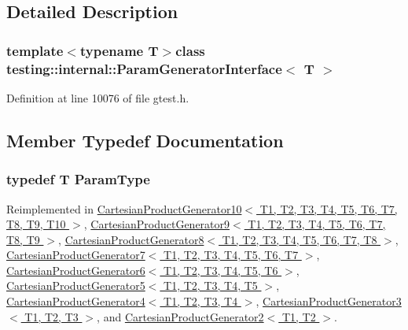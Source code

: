 \subsection{\-Detailed \-Description}
\subsubsection*{template$<$typename \-T$>$class testing\-::internal\-::\-Param\-Generator\-Interface$<$ T $>$}



\-Definition at line 10076 of file gtest.\-h.



\subsection{\-Member \-Typedef \-Documentation}
\hypertarget{classtesting_1_1internal_1_1ParamGeneratorInterface_a1c17d95e5946c3f940ece2bd9165fc34}{
\subsubsection[{\-Param\-Type}]{\setlength{\rightskip}{0pt plus 5cm}typedef \-T {\bf \-Param\-Type}}}\label{d3/d4a/classtesting_1_1internal_1_1ParamGeneratorInterface_a1c17d95e5946c3f940ece2bd9165fc34}


\-Reimplemented in \hyperlink{classtesting_1_1internal_1_1CartesianProductGenerator10_adffde37eb66ea6d9917ab9fd24b46926}{\-Cartesian\-Product\-Generator10$<$ T1, T2, T3, T4, T5, T6, T7, T8, T9, T10 $>$}, \hyperlink{classtesting_1_1internal_1_1CartesianProductGenerator9_a311b2d1d5a489d4841f258a70f33bf9d}{\-Cartesian\-Product\-Generator9$<$ T1, T2, T3, T4, T5, T6, T7, T8, T9 $>$}, \hyperlink{classtesting_1_1internal_1_1CartesianProductGenerator8_a1323810362151af79d39617fabdcade1}{\-Cartesian\-Product\-Generator8$<$ T1, T2, T3, T4, T5, T6, T7, T8 $>$}, \hyperlink{classtesting_1_1internal_1_1CartesianProductGenerator7_a18469e04d44a379d754ff5044f09531f}{\-Cartesian\-Product\-Generator7$<$ T1, T2, T3, T4, T5, T6, T7 $>$}, \hyperlink{classtesting_1_1internal_1_1CartesianProductGenerator6_a2f46503012c4ef785ad3fe03defbc7e1}{\-Cartesian\-Product\-Generator6$<$ T1, T2, T3, T4, T5, T6 $>$}, \hyperlink{classtesting_1_1internal_1_1CartesianProductGenerator5_a39880336d68d34bdc77e7e8726d38a91}{\-Cartesian\-Product\-Generator5$<$ T1, T2, T3, T4, T5 $>$}, \hyperlink{classtesting_1_1internal_1_1CartesianProductGenerator4_a99c0f82cb1095cf66d28100490e9fa39}{\-Cartesian\-Product\-Generator4$<$ T1, T2, T3, T4 $>$}, \hyperlink{classtesting_1_1internal_1_1CartesianProductGenerator3_a61f35be35e7acfed27d8b46ee9713bb3}{\-Cartesian\-Product\-Generator3$<$ T1, T2, T3 $>$}, and \hyperlink{classtesting_1_1internal_1_1CartesianProductGenerator2_aa0cb85aed1e62dc1934db8788770bedc}{\-Cartesian\-Product\-Generator2$<$ T1, T2 $>$}.



